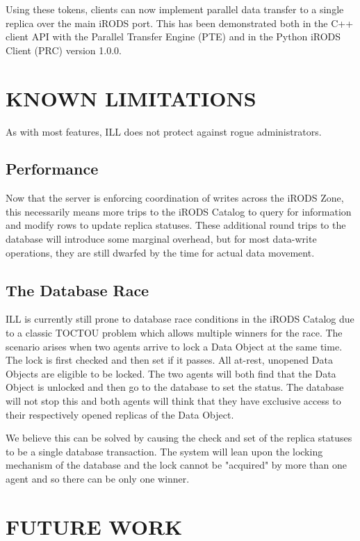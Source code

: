 \documentclass{irodsugm}
\begin{document}
Using these tokens, clients can now implement parallel data transfer to a single replica over the main iRODS port. This has been demonstrated both in the C++ client API with the Parallel Transfer Engine (PTE) and in the Python iRODS Client (PRC)\cite{prc} version 1.0.0.

\section*{KNOWN LIMITATIONS}

As with most features, ILL does not protect against rogue administrators.

\subsection*{Performance}
Now that the server is enforcing coordination of writes across the iRODS Zone, this necessarily means more trips to the iRODS Catalog to query for information and modify rows to update replica statuses.  These additional round trips to the database will introduce some marginal overhead, but for most data-write operations, they are still dwarfed by the time for actual data movement.

\subsection*{The Database Race}
ILL is currently still prone to database race conditions in the iRODS Catalog due to a classic TOCTOU\cite{toctou} problem which allows multiple winners for the race. The scenario arises when two agents arrive to lock a Data Object at the same time. The lock is first checked and then set if it passes. All at-rest, unopened Data Objects are eligible to be locked. The two agents will both find that the Data Object is unlocked and then go to the database to set the status. The database will not stop this and both agents will think that they have exclusive access to their respectively opened replicas of the Data Object.

We believe this can be solved by causing the check and set of the replica statuses to be a single database transaction.  The system will lean upon the locking mechanism of the database and the lock cannot be "acquired" by more than one agent and so there can be only one winner.

\section*{FUTURE WORK}
\end{document}
